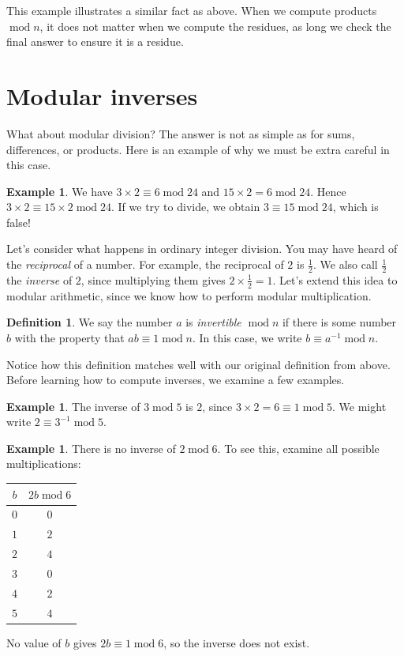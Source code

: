 \documentclass{book}
\theoremstyle{plain}
\theoremstyle{definition}
\newtheorem{definition}[theorem]{Definition}
\newtheorem{example}[theorem]{Example}
\renewcommand{\mod}{\operatorname{mod}}
\renewcommand{\mod}{\operatorname{mod}}
\begin{document}
This example illustrates a similar fact as above. When we compute products $\mod n$, it does not matter when we compute the residues, as long we check the final answer to ensure it is a residue.

\section{Modular inverses}
What about modular division? The answer is not as simple as for sums, differences, or products. Here is an example of why we must be extra careful in this case.

\begin{example}
We have $3 \times 2 \equiv 6 \mod 24$ and $15 \times 2 = 6 \mod 24$. Hence $3 \times 2 \equiv 15 \times 2 \mod 24$. If we try to divide, we obtain $3 \equiv 15 \mod 24$, which is false!
\end{example}

Let's consider what happens in ordinary integer division. You may have heard of the {\it reciprocal} of a number. For example, the reciprocal of $2$ is $\frac{1}{2}$. We also call $\frac{1}{2}$ the {\it inverse} of $2$, since multiplying them gives $2 \times \frac{1}{2} = 1$. Let's extend this idea to modular arithmetic, since we know how to perform modular multiplication.

\begin{definition}
We say the number $a$ is {\it invertible $\mod n$} if there is some number $b$ with the property that $ab \equiv 1 \mod n$. In this case, we write $b \equiv a^{-1} \mod n$.
\end{definition}

Notice how this definition matches well with our original definition from above. Before learning how to compute inverses, we examine a few examples.

\begin{example}
The inverse of $3 \mod 5$ is $2$, since $3 \times 2 = 6 \equiv 1 \mod 5$. We might write $2 \equiv 3^{-1} \mod 5$.
\end{example}

\begin{example}
There is no inverse of $2 \mod 6$. To see this, examine all possible multiplications:
\begin{center}
\begin{tabular}{|c|c|}
\hline
$b$ & $2b \mod 6$ \\
\hline
$0$ & $0$ \\
$1$ & $2$ \\
$2$ & $4$ \\
$3$ & $0$ \\
$4$ & $2$ \\
$5$ & $4$ \\
\hline
\end{tabular}
\end{center}
No value of $b$ gives $2b \equiv 1 \mod 6$, so the inverse does not exist.
\end{example}
\end{document}
